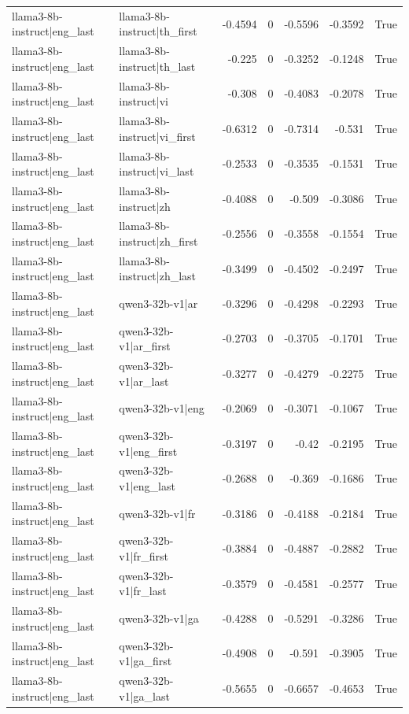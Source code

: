 \begin{table}
\begin{tabular}{l l r r r r l}
llama3-8b-instruct|eng_last & llama3-8b-instruct|th_first & -0.4594 & 0 & -0.5596 & -0.3592 & True \\
llama3-8b-instruct|eng_last & llama3-8b-instruct|th_last & -0.225 & 0 & -0.3252 & -0.1248 & True \\
llama3-8b-instruct|eng_last & llama3-8b-instruct|vi & -0.308 & 0 & -0.4083 & -0.2078 & True \\
llama3-8b-instruct|eng_last & llama3-8b-instruct|vi_first & -0.6312 & 0 & -0.7314 & -0.531 & True \\
llama3-8b-instruct|eng_last & llama3-8b-instruct|vi_last & -0.2533 & 0 & -0.3535 & -0.1531 & True \\
llama3-8b-instruct|eng_last & llama3-8b-instruct|zh & -0.4088 & 0 & -0.509 & -0.3086 & True \\
llama3-8b-instruct|eng_last & llama3-8b-instruct|zh_first & -0.2556 & 0 & -0.3558 & -0.1554 & True \\
llama3-8b-instruct|eng_last & llama3-8b-instruct|zh_last & -0.3499 & 0 & -0.4502 & -0.2497 & True \\
llama3-8b-instruct|eng_last & qwen3-32b-v1|ar & -0.3296 & 0 & -0.4298 & -0.2293 & True \\
llama3-8b-instruct|eng_last & qwen3-32b-v1|ar_first & -0.2703 & 0 & -0.3705 & -0.1701 & True \\
llama3-8b-instruct|eng_last & qwen3-32b-v1|ar_last & -0.3277 & 0 & -0.4279 & -0.2275 & True \\
llama3-8b-instruct|eng_last & qwen3-32b-v1|eng & -0.2069 & 0 & -0.3071 & -0.1067 & True \\
llama3-8b-instruct|eng_last & qwen3-32b-v1|eng_first & -0.3197 & 0 & -0.42 & -0.2195 & True \\
llama3-8b-instruct|eng_last & qwen3-32b-v1|eng_last & -0.2688 & 0 & -0.369 & -0.1686 & True \\
llama3-8b-instruct|eng_last & qwen3-32b-v1|fr & -0.3186 & 0 & -0.4188 & -0.2184 & True \\
llama3-8b-instruct|eng_last & qwen3-32b-v1|fr_first & -0.3884 & 0 & -0.4887 & -0.2882 & True \\
llama3-8b-instruct|eng_last & qwen3-32b-v1|fr_last & -0.3579 & 0 & -0.4581 & -0.2577 & True \\
llama3-8b-instruct|eng_last & qwen3-32b-v1|ga & -0.4288 & 0 & -0.5291 & -0.3286 & True \\
llama3-8b-instruct|eng_last & qwen3-32b-v1|ga_first & -0.4908 & 0 & -0.591 & -0.3905 & True \\
llama3-8b-instruct|eng_last & qwen3-32b-v1|ga_last & -0.5655 & 0 & -0.6657 & -0.4653 & True \\

\end{tabular}
\end{table}
